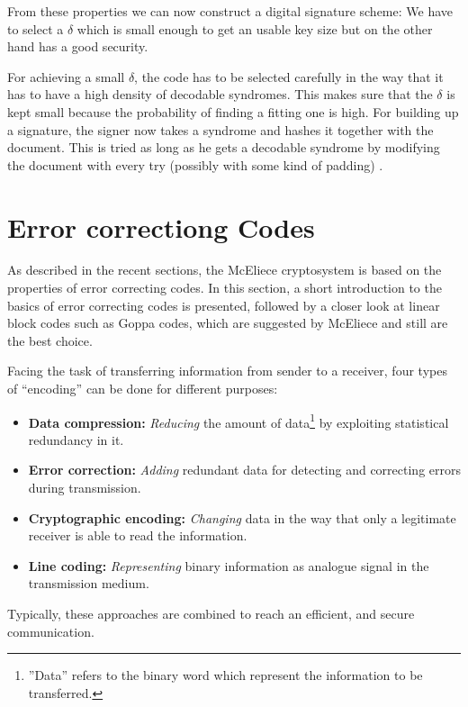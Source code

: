 From these properties we can now construct a digital signature scheme: We have to select a $\delta$ which is small enough to get an usable key size but on the other hand has a good security. 

For achieving a small $\delta$, the code has to be selected carefully in the way that it has to have a high density of decodable syndromes. This makes sure that the $\delta$ is kept small because the probability of finding a fitting one is high. For building up a signature, the signer now takes a syndrome and hashes it together with the document. This is tried as long as he gets a decodable syndrome by modifying the document with every try (possibly with some kind of padding) . \cite{courtois2001achieve}



\section{Error correctiong Codes} 
\label{coding}
As described in the recent sections, the McEliece cryptosystem is based on the properties of error correcting codes. In this section, a short introduction to the basics of error correcting codes is presented, followed by a closer look at linear block codes such as Goppa codes, which are suggested by McEliece and still are the best choice.


Facing the task of transferring information from sender to a receiver, four types of ``encoding'' can be done for different purposes: 
\begin{itemize}
	\item \textbf{Data compression:} \textit{Reducing} the amount of data\footnote{''Data'' refers to the binary word which represent the information to be transferred.} by exploiting statistical redundancy in it.
	\item \textbf{Error correction:} \textit{Adding} redundant data for detecting and correcting errors during transmission. 
	\item \textbf{Cryptographic encoding:} \textit{Changing} data in the way that only a legitimate receiver is able to read the information.
	\item \textbf{Line coding:} \textit{Representing} binary information as analogue signal in the transmission medium.
\end{itemize}
Typically, these approaches are combined to reach an efficient, and secure communication.\cite[323ff.]{hoffmann2014einfuhrung}

